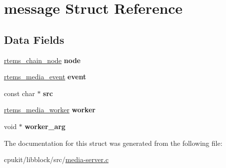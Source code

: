 \hypertarget{structmessage}{}\section{message Struct Reference}
\label{structmessage}
\subsection*{Data Fields}
\begin{DoxyCompactItemize}
\item 
\mbox{\label{structmessage_a0d4dfc216fdade2819e7f5bddb31b02f}} 
\mbox{\hyperlink{structChain__Node__struct}{rtems\+\_\+chain\+\_\+node}} {\bfseries node}
\item 
\mbox{\label{structmessage_ab6eb28ba699336af9201ea08d4e3cfe5}} 
\mbox{\hyperlink{group__RTEMSIOMedia_gadd58c5799ee997413d4d6be2ac05197b}{rtems\+\_\+media\+\_\+event}} {\bfseries event}
\item 
\mbox{\label{structmessage_a61847d3c59c7f2c6764f39f002a34d70}} 
const char $\ast$ {\bfseries src}
\item 
\mbox{\label{structmessage_a5e6b54cb0c69d6a54a54bb056c3433bb}} 
\mbox{\hyperlink{group__RTEMSIOMedia_ga4d3df16c316c9285e61bf0f735cafdd3}{rtems\+\_\+media\+\_\+worker}} {\bfseries worker}
\item 
\mbox{\label{structmessage_aea6920987771c30485d418f0b67d488d}} 
void $\ast$ {\bfseries worker\+\_\+arg}
\end{DoxyCompactItemize}


The documentation for this struct was generated from the following file\+:\begin{DoxyCompactItemize}
\item 
cpukit/libblock/src/\mbox{\hyperlink{media-server_8c}{media-\/server.\+c}}\end{DoxyCompactItemize}
